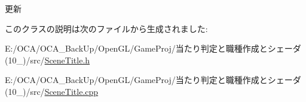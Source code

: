 更新 



このクラスの説明は次のファイルから生成されました\-:\begin{DoxyCompactItemize}
\item 
E\-:/\-O\-C\-A/\-O\-C\-A\-\_\-\-Back\-Up/\-Open\-G\-L/\-Game\-Proj/当たり判定と職種作成とシェーダ(10\-\_)/src/\hyperlink{_scene_title_8h}{Scene\-Title.\-h}\item 
E\-:/\-O\-C\-A/\-O\-C\-A\-\_\-\-Back\-Up/\-Open\-G\-L/\-Game\-Proj/当たり判定と職種作成とシェーダ(10\-\_)/src/\hyperlink{_scene_title_8cpp}{Scene\-Title.\-cpp}\end{DoxyCompactItemize}
